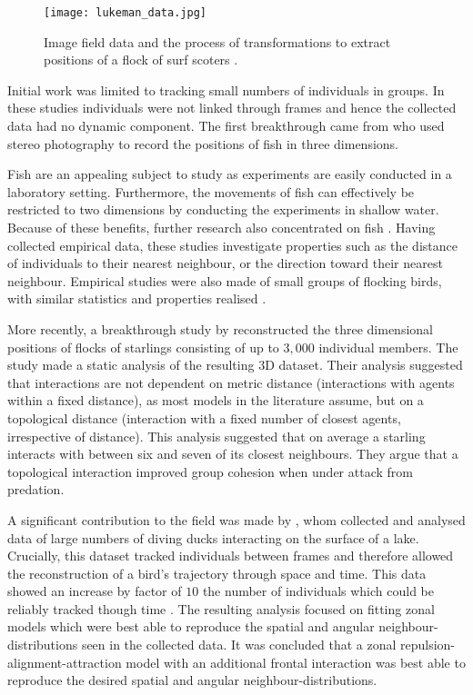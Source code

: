 \begin{figure}[!htbp]
	\texttt{[image: lukeman\_data.jpg]}
	\caption{Image field data and the process of transformations to extract positions of a flock of surf scoters \citep{lukeman10}.}
	\label{fig:lukeman_extraction}
\end{figure}

Initial work was limited to tracking small numbers of individuals in groups. In these studies individuals were not linked through frames and hence the collected data had no dynamic component. The first breakthrough came from \citet{cullen65} who used stereo photography to record the positions of fish in three dimensions.

Fish are an appealing subject to study as experiments are easily conducted in a laboratory setting. Furthermore, the movements of fish can effectively be restricted to two dimensions by conducting the experiments in shallow water. Because of these benefits, further research also concentrated on fish \citep{van_long85, partridge80}. Having collected empirical data, these studies investigate properties such as the distance of individuals to their nearest neighbour, or the direction toward their nearest neighbour. Empirical studies were also made of small groups of flocking birds, with similar statistics and properties realised \citep{major78, budgey98}.

More recently, a breakthrough study by \citet{ballerini08} reconstructed the three dimensional positions of flocks of starlings consisting of up to $3,000$ individual members. The study made a static analysis of the resulting 3D dataset. Their analysis suggested that interactions are not dependent on metric distance (interactions with agents within a fixed distance), as most models in the literature assume, but on a topological distance (interaction with a fixed number of closest agents, irrespective of distance). This analysis suggested that on average a starling interacts with between six and seven of its closest neighbours. They argue that a topological interaction improved group cohesion when under attack from predation.

A significant contribution to the field was made by \citet{lukeman10}, whom collected and analysed data of large numbers of diving ducks interacting on the surface of a lake. Crucially, this dataset tracked individuals between frames and therefore allowed the reconstruction of a bird's trajectory through space and time. This data showed an increase by factor of $10$ the number of individuals which could be reliably tracked though time \citep{lukeman09}. The resulting analysis focused on fitting zonal models which were best able to reproduce the spatial and angular neighbour-distributions seen in the collected data. It was concluded that a zonal repulsion-alignment-attraction model with an additional frontal interaction was best able to reproduce the desired spatial and angular neighbour-distributions.

